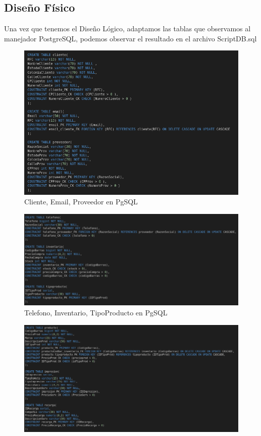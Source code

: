 \documentclass[letter,12pt]{article}
\begin{document}
\subsection{Diseño Físico}
Una vez que tenemos el Diseño Lógico, adaptamos las tablas que observamos al manejador PostgreSQL, podemos observar el resultado en el archivo ScriptDB.sql
\begin{center}
\begin{figure}[H]
\includegraphics[scale=.5]{clienteEmailProveedorBD.png}
\caption{Cliente, Email, Proveedor en PgSQL}
\end{figure}
\begin{figure}[H]
\includegraphics[scale=.45]{telefonoInventarioBD.png}
\caption{Telefono, Inventario, TipoProducto en PgSQL}
\end{figure}
\begin{figure}[H]
\includegraphics[scale=.45]{productoImpresionRecargaBD.png}

\end{figure}
\end{center}
\end{document}
